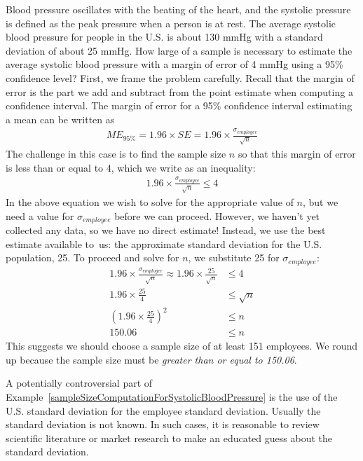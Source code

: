 \begin{example}{Blood pressure oscillates with the beating of the heart, and the systolic pressure is defined as the peak pressure when a person is at rest. The average systolic blood pressure for people in the U.S. is about 130 mmHg with a standard deviation of about 25 mmHg. How large of a sample is necessary to estimate the average systolic blood pressure with a margin of error of 4 mmHg using a 95\% confidence level?}
\label{sampleSizeComputationForSystolicBloodPressure}
First, we frame the problem carefully. Recall that the margin of error is the part we add and subtract from the point estimate when computing a confidence interval. The margin of error for a 95\% confidence interval estimating a mean can be written as
\begin{align*}
ME_{95\%} = 1.96\times SE = 1.96\times\frac{\sigma_{employee}}{\sqrt{n}}
\end{align*}
The challenge in this case is to find the sample size $n$ so that this margin of error is less than or equal to 4, which we write as an inequality:
\begin{align*}
1.96\times \frac{\sigma_{employee}}{\sqrt{n}} \leq 4
\end{align*}
In the above equation we wish to solve for the appropriate value of $n$, but we need a value for $\sigma_{employee}$ before we can proceed. However, we haven't yet collected any data, so we have no direct estimate! Instead, we use the best estimate available to~us: the approximate standard deviation for the U.S. population, 25. To proceed and solve for $n$, we substitute 25 for $\sigma_{employee}$:
\begin{align*}
1.96\times \frac{\sigma_{employee}}{\sqrt{n}} \approx 1.96\times\frac{25}{\sqrt{n}}
	&\leq 4 \\
1.96\times\frac{25}{4} &\leq \sqrt{n} \\
\left(1.96\times\frac{25}{4}\right)^2 &\leq n \\
150.06 &\leq n
\end{align*}
This suggests we should choose a sample size of at least 151 employees. We round up because the sample size must be \emph{greater than or equal to 150.06}.
\end{example}

A potentially controversial part of Example~\ref{sampleSizeComputationForSystolicBloodPressure} is the use of the U.S. standard deviation for the employee standard deviation. Usually the standard deviation is not known. In such cases, it is reasonable to review scientific literature or market research to make an educated guess about the standard deviation.

